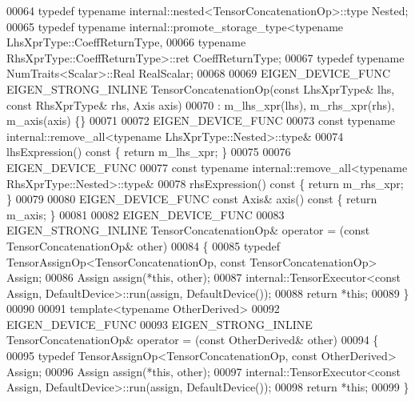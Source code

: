 \begin{DoxyCode}
00064     \textcolor{keyword}{typedef} \textcolor{keyword}{typename} internal::nested<TensorConcatenationOp>::type Nested;
00065     \textcolor{keyword}{typedef} \textcolor{keyword}{typename} internal::promote\_storage\_type<\textcolor{keyword}{typename} LhsXprType::CoeffReturnType,
00066                                                     \textcolor{keyword}{typename} RhsXprType::CoeffReturnType>::ret 
      CoeffReturnType;
00067     \textcolor{keyword}{typedef} \textcolor{keyword}{typename} NumTraits<Scalar>::Real RealScalar;
00068 
00069     EIGEN\_DEVICE\_FUNC EIGEN\_STRONG\_INLINE TensorConcatenationOp(\textcolor{keyword}{const} LhsXprType& lhs, \textcolor{keyword}{const} RhsXprType& 
      rhs, Axis axis)
00070         : m\_lhs\_xpr(lhs), m\_rhs\_xpr(rhs), m\_axis(axis) \{\}
00071 
00072     EIGEN\_DEVICE\_FUNC
00073     \textcolor{keyword}{const} \textcolor{keyword}{typename} internal::remove\_all<typename LhsXprType::Nested>::type&
00074     lhsExpression()\textcolor{keyword}{ const }\{ \textcolor{keywordflow}{return} m\_lhs\_xpr; \}
00075 
00076     EIGEN\_DEVICE\_FUNC
00077     \textcolor{keyword}{const} \textcolor{keyword}{typename} internal::remove\_all<typename RhsXprType::Nested>::type&
00078     rhsExpression()\textcolor{keyword}{ const }\{ \textcolor{keywordflow}{return} m\_rhs\_xpr; \}
00079 
00080     EIGEN\_DEVICE\_FUNC \textcolor{keyword}{const} Axis& axis()\textcolor{keyword}{ const }\{ \textcolor{keywordflow}{return} m\_axis; \}
00081 
00082     EIGEN\_DEVICE\_FUNC
00083     EIGEN\_STRONG\_INLINE TensorConcatenationOp& operator = (\textcolor{keyword}{const} TensorConcatenationOp& other)
00084     \{
00085       \textcolor{keyword}{typedef} TensorAssignOp<TensorConcatenationOp, const TensorConcatenationOp> Assign;
00086       Assign assign(*\textcolor{keyword}{this}, other);
00087       internal::TensorExecutor<const Assign, DefaultDevice>::run(assign, DefaultDevice());
00088       \textcolor{keywordflow}{return} *\textcolor{keyword}{this};
00089     \}
00090 
00091     \textcolor{keyword}{template}<\textcolor{keyword}{typename} OtherDerived>
00092     EIGEN\_DEVICE\_FUNC
00093     EIGEN\_STRONG\_INLINE TensorConcatenationOp& operator = (\textcolor{keyword}{const} OtherDerived& other)
00094     \{
00095       \textcolor{keyword}{typedef} TensorAssignOp<TensorConcatenationOp, const OtherDerived> Assign;
00096       Assign assign(*\textcolor{keyword}{this}, other);
00097       internal::TensorExecutor<const Assign, DefaultDevice>::run(assign, DefaultDevice());
00098       \textcolor{keywordflow}{return} *\textcolor{keyword}{this};
00099     \}

\end{DoxyCode}
